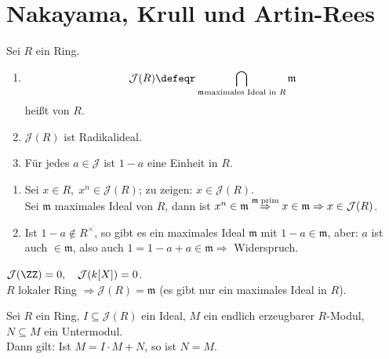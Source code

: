 \section{Nakayama, Krull und Artin-Rees}

\begin{DefBem}

Sei $R$ ein Ring.
\begin{enumerate}
	\item $$\mathcal{J}(R) \defeqr \bigcap_{\mathfrak{m}\text{\scriptsize maximales Ideal in }R}\mathfrak{m}$$ heißt  von $R$.
	\item $\mathcal{J}(R)$ ist Radikalideal.
	\item Für jedes $a \in \mathcal{J}$ ist $1-a$ eine Einheit in $R$.
\end{enumerate}

\end{DefBem}

\begin{Bew}

\begin{enumerate}
	\item Sei $x \in R, \; x^n \in \mathcal{J}(R)$; zu zeigen: $x \in \mathcal{J}(R)$.\\
	Sei $\mathfrak{m}$ maximales Ideal von $R$, dann ist $x^n \in \mathfrak{m}
	\overset{\mathfrak{m} \; \text{\scriptsize prim}}{\Rightarrow} x \in
	\mathfrak{m} \Rightarrow x \in \mathcal{J}(R)$.
	\item Ist $1-a \notin R^{\times}$, so gibt es ein maximales Ideal
	$\mathfrak{m}$ mit $1-a \in \mathfrak{m}$, aber: $a$ ist auch $\in
	\mathfrak{m}$, also auch $1 = 1-a+a \in \mathfrak{m} \Rightarrow$ Widerspruch.
\end{enumerate}
\end{Bew}

\begin{nnBsp}
  $\mathcal{J}(\ZZ) = 0, \quad \mathcal{J}(k[X]) = 0$.\\
  $R$ lokaler Ring $\Rightarrow \mathcal{J}(R) = \mathfrak{m}$ (es gibt nur ein
  maximales Ideal in $R$).
\end{nnBsp}

\begin{Satz}
\label{Satz8}
  Sei $R$ ein Ring, $I \subseteq \mathcal{J}(R)$ ein Ideal, $M$ ein endlich erzeugbarer $R$-Modul, $N \subseteq M$ ein Untermodul.\\
  Dann gilt: Ist $M = I \cdot M + N$, so ist $N = M$.
\end{Satz}

